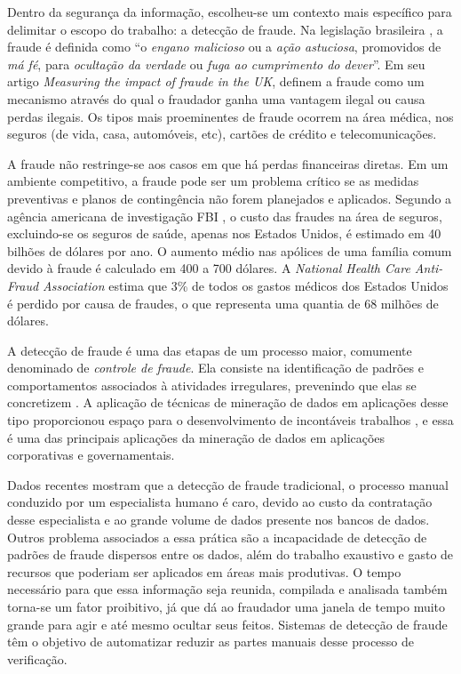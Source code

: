 Dentro da segurança da informação, escolheu-se um contexto mais específico para delimitar o escopo do trabalho: a detecção de fraude. Na legislação brasileira \cite[p. 324]{DePlacido1982}, a fraude é definida como ``o \emph{engano malicioso} ou a \emph{ação astuciosa}, promovidos de \emph{má fé}, para \emph{ocultação da verdade} ou \emph{fuga ao cumprimento do dever}''. Em seu artigo \emph{Measuring the impact of fraude in the UK}, \citet{Levi2008} definem a fraude como um mecanismo através do qual o fraudador ganha uma vantagem ilegal ou causa perdas ilegais. Os tipos mais proeminentes de fraude ocorrem na área médica, nos seguros (de vida, casa, automóveis, etc), cartões de crédito e telecomunicações.

A fraude não restringe-se aos casos em que há perdas financeiras diretas. Em um ambiente competitivo, a fraude pode ser um problema crítico se as medidas preventivas e planos de contingência não forem planejados e aplicados. Segundo a agência americana de investigação FBI \cite{FBI2010}, o custo das fraudes na área de seguros, excluindo-se os seguros de saúde, apenas nos Estados Unidos, é estimado em 40 bilhões de dólares por ano. O aumento médio nas apólices de uma família comum devido à fraude é calculado em 400 a 700 dólares. A \emph{National Health Care Anti-Fraud Association} estima que 3\% de todos os gastos médicos dos Estados Unidos é perdido por causa de fraudes, o que representa uma quantia de 68 milhões de dólares.

A detecção de fraude é uma das etapas de um processo maior, comumente denominado de \emph{controle de fraude}. Ela consiste na identificação de padrões e comportamentos associados à atividades irregulares, prevenindo que elas se concretizem \cite{Phua2010}. A aplicação de técnicas de mineração de dados em aplicações desse tipo proporcionou espaço para o desenvolvimento de incontáveis trabalhos \cite{Phua2010}, e essa é uma das principais aplicações da mineração de dados em aplicações corporativas e governamentais.

Dados recentes mostram que a detecção de fraude tradicional, o processo manual conduzido por um especialista humano é caro, devido ao custo da contratação desse especialista e ao grande volume de dados presente nos bancos de dados. Outros problema associados a essa prática são a incapacidade de detecção de padrões de fraude dispersos entre os dados, além do trabalho exaustivo e gasto de recursos que poderiam ser aplicados em áreas mais produtivas. O tempo necessário para que essa informação seja reunida, compilada e analisada também torna-se um fator proibitivo, já que dá ao fraudador uma janela de tempo muito grande para agir e até mesmo ocultar seus feitos. Sistemas de detecção de fraude têm o objetivo de automatizar reduzir as partes manuais desse processo de verificação.

